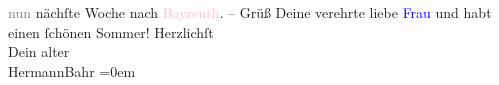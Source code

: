                   \textcolor{gray}{nun} nächſte Woche nach \textcolor{pink}{Bayreuth}{}\ledrightnote{\textcolor{pink}{Bayreuth}}. – Grüß Deine verehrte liebe \textcolor{blue}{Frau}{} und habt einen ſchönen Sommer!\pend
           \pstart
           Herzlichſt{\\[\baselineskip]}Dein alter{\\[\baselineskip]}\spacefill\mbox{HermannBahr}\pend
           \leftskip=0em{}\endnumbering{}  
      